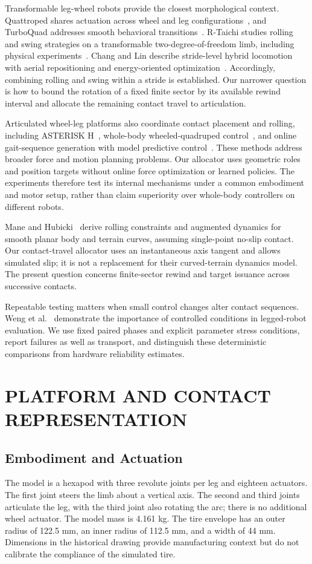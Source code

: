 \documentclass[letterpaper,10pt,conference]{ieeeconf}
\begin{document}
Transformable leg-wheel robots provide the closest morphological context. Quattroped shares actuation across wheel and leg configurations~\cite{chen2014quattroped}, and TurboQuad addresses smooth behavioral transitions~\cite{chen2017turboquad}. R-Taichi studies rolling and swing strategies on a transformable two-degree-of-freedom limb, including physical experiments~\cite{xue2025rolling}. Chang and Lin describe stride-level hybrid locomotion with aerial repositioning and energy-oriented optimization~\cite{chang2026stride}. Accordingly, combining rolling and swing within a stride is established. Our narrower question is how to bound the rotation of a fixed finite sector by its available rewind interval and allocate the remaining contact travel to articulation.

Articulated wheel-leg platforms also coordinate contact placement and rolling, including ASTERISK H~\cite{yoshioka2008asterisk}, whole-body wheeled-quadruped control~\cite{bjelonic2019keep}, and online gait-sequence generation with model predictive control~\cite{bjelonic2021wholebody}. These methods address broader force and motion planning problems. Our allocator uses geometric roles and position targets without online force optimization or learned policies. The experiments therefore test its internal mechanisms under a common embodiment and motor setup, rather than claim superiority over whole-body controllers on different robots.

Mane and Hubicki~\cite{mane2024rolling} derive rolling constraints and augmented dynamics for smooth planar body and terrain curves, assuming single-point no-slip contact. Our contact-travel allocator uses an instantaneous axis tangent and allows simulated slip; it is not a replacement for their curved-terrain dynamics model. The present question concerns finite-sector rewind and target issuance across successive contacts.

Repeatable testing matters when small control changes alter contact sequences. Weng et al.~\cite{weng2024testing} demonstrate the importance of controlled conditions in legged-robot evaluation. We use fixed paired phases and explicit parameter stress conditions, report failures as well as transport, and distinguish these deterministic comparisons from hardware reliability estimates.

\section{PLATFORM AND CONTACT REPRESENTATION}
\subsection{Embodiment and Actuation}
The model is a hexapod with three revolute joints per leg and eighteen actuators. The first joint steers the limb about a vertical axis. The second and third joints articulate the leg, with the third joint also rotating the arc; there is no additional wheel actuator. The model mass is 4.161 kg. The tire envelope has an outer radius of 122.5 mm, an inner radius of 112.5 mm, and a width of 44 mm. Dimensions in the historical drawing provide manufacturing context but do not calibrate the compliance of the simulated tire.
\end{document}
